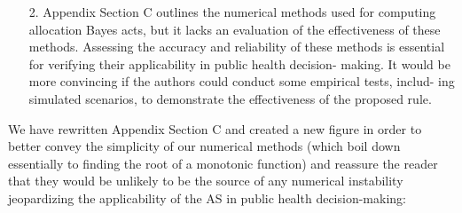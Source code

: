 \documentclass{article}
\begin{document}
\begin{quotebar}
\begin{enumerate}
  \item[2.] Appendix Section C outlines the numerical methods used for computing allocation Bayes acts, but it lacks an evaluation of the effectiveness of these methods. Assessing the accuracy and reliability of these methods is essential for verifying their applicability in public health decision- making. It would be more convincing if the authors could conduct some empirical tests, includ- ing simulated scenarios, to demonstrate the effectiveness of the proposed rule.
\end{enumerate}
\end{quotebar}

We have rewritten Appendix Section C and created a new figure in order to better convey the simplicity of our numerical methods 
(which boil down essentially to finding the root of a monotonic function)
and reassure the reader that they would be unlikely to be the source of any numerical instability jeopardizing the applicability of the AS in
public health decision-making:
\end{document}
